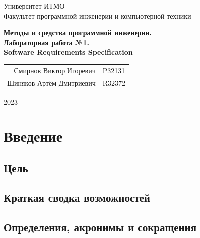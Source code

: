 \documentclass{article}
\begin{document}
\begin{titlepage}
  \begin{center}
    \begin{spacing}{1.4}
      \large{Университет ИТМО} \\
      \large{Факультет программной инженерии и компьютерной техники} \\
    \end{spacing}
    \vfill
    \textbf{
      \huge{Методы и средства программной инженерии.} \\
      \huge{Лабораторная работа №1.} \\
      \huge{Software Requirements Specification} \\
    }
  \end{center}
  \vfill
  \begin{center}
    \begin{tabular}{r l}
      Смирнов Виктор Игоревич  & P32131 \\
      Шиняков Артём Дмитриевич & R32372 \\
    \end{tabular}
  \end{center}
  \vfill
  \begin{center}
    \begin{large}
      2023
    \end{large}
  \end{center}
\end{titlepage}

\tableofcontents

\section{Введение}

\subsection{Цель}


\subsection{Краткая сводка возможностей}


\subsection{Определения, акронимы и сокращения}

\end{document}
